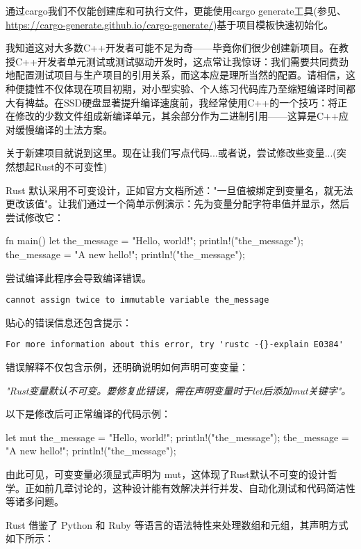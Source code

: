 通过cargo我们不仅能创建库和可执行文件，更能使用cargo generate工具(参见、\url{https://cargo-generate.github.io/cargo-generate/})基于项目模板快速初始化。

我知道这对大多数C++开发者可能不足为奇——毕竟你们很少创建新项目。在教授C++开发者单元测试或测试驱动开发时，这点常让我惊讶：我们需要共同费劲地配置测试项目与生产项目的引用关系，而这本应是理所当然的配置。请相信，这种便捷性不仅体现在项目初期，对小型实验、个人练习代码库乃至缩短编译时间都大有裨益。在SSD硬盘显著提升编译速度前，我经常使用C++的一个技巧：将正在修改的少数文件组成新编译单元，其余部分作为二进制引用——这算是C++应对缓慢编译的土法方案。

关于新建项目就说到这里。现在让我们写点代码...或者说，尝试修改些变量...(突然想起Rust的不可变性)


Rust 默认采用不可变设计，正如官方文档所述："一旦值被绑定到变量名，就无法更改该值"。让我们通过一个简单示例演示：先为变量分配字符串值并显示，然后尝试修改它：

\begin{rust}
fn main() {
  let the_message = "Hello, world!";
  println!("{the_message}");
  the_message = "A new hello!";
  println!("{the_message}");
}
\end{rust}

尝试编译此程序会导致编译错误。

\verb|cannot assign twice to immutable variable the_message| 

贴心的错误信息还包含提示：

\verb|For more information about this error, try 'rustc -{}-explain E0384'|

错误解释不仅包含示例，还明确说明如何声明可变变量：

\textit{"Rust变量默认不可变。要修复此错误，需在声明变量时于let后添加mut关键字"。}

以下是修改后可正常编译的代码示例：

\begin{rust}
let mut the_message = "Hello, world!";
println!("{the_message}");
the_message = "A new hello!";
println!("{the_message}");
\end{rust}

由此可见，可变变量必须显式声明为 mut，这体现了Rust默认不可变的设计哲学。正如前几章讨论的，这种设计能有效解决并行并发、自动化测试和代码简洁性等诸多问题。


Rust 借鉴了 Python 和 Ruby 等语言的语法特性来处理数组和元组，其声明方式如下所示：

